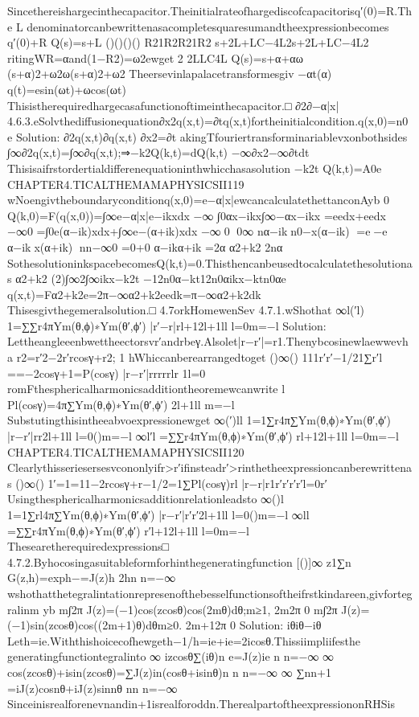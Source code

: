 {{{{{{Sincethereishargecinthecapacitor.Theinitialrateofhargediscofcapacitorisq′(0)=R.The
L
denominatorcanbewrittenasacompletesquaresumandtheexpressionbecomes
q′(0)+R
Q(s)=s+L
()()()()
R21R2R21R2
s+2L+LC−4L2s+2L+LC−4L2
ritingWR=αand(1−R2)=ω2ewget
2
2LLC4L
Q(s)=s+α+αω
(s+α)2+ω2ω(s+α)2+ω2
Theersevinlapalacetransformesgiv
−αt(α)
q(t)=esin(ωt)+ωcos(ωt)
Thisistherequiredhargecasafunctionoftimeinthecapacitor.□
∂2∂−α|x|
4.6.3.eSolvthediffusionequation∂x2q(x,t)=∂tq(x,t)fortheinitialcondition.q(x,0)=n0e
Solution:
∂2q(x,t)∂q(x,t)
∂x2=∂t
akingTfouriertransforminariablevxonbothsides
∫∞∂2q(x,t)=∫∞∂q(x,t);⇒−k2Q(k,t)=dQ(k,t)
−∞∂x2−∞∂tdt
Thisisaifrstordertialdifferenequationinthwhicchasasolution
−k2t
Q(k,t)=A0e
CHAPTER4.TICALTHEMAMAPHYSICSII119
wNoengivtheboundaryconditionq(x,0)=e−α|x|ewcancalculatethettanconAyb
0
Q(k,0)=F(q(x,0))=∫∞e−α|x|e−ikxdx
−∞
∫0αx−ikx∫∞−αx−ikx
=eedx+eedx
−∞0
=∫0e(α−ik)xdx+∫∞e−(α+ik)xdx
−∞0
0∞
nα−ikn0−x(α−ik)
=e−e
α−ikx(α+ik)
nn−∞0
=0+0
α−ikα+ik
=2α
α2+k2
2nα
SothesolutioninkspacebecomesQ(k,t)=0.Thisthencanbeusedtocalculatethesolutionas
α2+k2
(2)∫∞2∫∞ikx−k2t
−12n0α−kt12n0αikx−ktn0αe
q(x,t)=Fα2+k2e=2π−∞α2+k2eedk=π−∞α2+k2dk
Thisesgivthegemeralsolution.□
4.7orkHomewenSev
4.7.1.wShothat
∞l(′l)
1=∑∑r4πYm(θ,ϕ)∗Ym(θ′,ϕ′)
|r′−r|rl+12l+1ll
l=0m=−l
Solution:
Lettheangleeenbwettheectorsvr′andrbeγ.Alsolet|r−r′|=r1.Thenybcosinewlaewwevha
r2=r′2−2r′rcosγ+r2;
1
hWhiccanberearrangedtoget
()∞()
111r′r′−1/21∑r′l
==−2cosγ+1=P(cosγ)
|r−r′|rrrrrlr
1l=0
romFthesphericalharmonicsadditiontheoremewcanwrite
l
Pl(cosγ)=4π∑Ym(θ,ϕ)∗Ym(θ′,ϕ′)
2l+1ll
m=−l
Substutingthisintheeabvoexpressionewget
∞(′)ll
1=1∑r4π∑Ym(θ,ϕ)∗Ym(θ′,ϕ′)
|r−r′|rr2l+1ll
l=0()m=−l
∞l′l
=∑∑r4πYm(θ,ϕ)∗Ym(θ′,ϕ′)
rl+12l+1ll
l=0m=−l
CHAPTER4.TICALTHEMAMAPHYSICSII120
Clearlythisseriesersesvcononlyifr>r′ifinsteadr′>rinthetheexpressioncanberewrittenas
()∞()
1′=1=11−2rcosγ+r−1/2=1∑Pl(cosγ)rl
|r−r|r1r′r′r′r′l=0r′
Usingthesphericalharmonicsadditionrelationleadsto
∞()l
1=1∑rl4π∑Ym(θ,ϕ)∗Ym(θ′,ϕ′)
|r−r′|r′r′2l+1ll
l=0()m=−l
∞ll
=∑∑r4πYm(θ,ϕ)∗Ym(θ′,ϕ′)
r′l+12l+1ll
l=0m=−l
Thesearetherequiredexpressions□
4.7.2.Byhocosingasuitableformforhinthegeneratingfunction
[()]∞
z1∑n
G(z,h)=exph−=J(z)h
2hn
n=−∞
wshothatthetegralintationrepresenofthebesselfunctionsoftheifrstkindareen,givfortegralinm
yb
m∫2π
J(z)=(−1)cos(zcosθ)cos(2mθ)dθ;m≥1,
2m2π
0
m∫2π
J(z)=(−1)sin(zcosθ)cos((2m+1)θ)dθm≥0.
2m+12π
0
Solution:
iθiθ−iθ
Leth=ie.Withthishoicecofhewgeth−1/h=ie+ie=2icosθ.Thissiimpliifesthe
generatingfunctiontegralinto
∞
izcosθ∑(iθ)n
e=J(z)ie
n
n=−∞
∞
cos(zcosθ)+isin(zcosθ)=∑J(z)in(cosθ+isinθ)n
n
n=−∞
∞
∑nn+1
=iJ(z)cosnθ+iJ(z)sinnθ
nn
n=−∞
Sinceinisrealforenevnandin+1isrealforoddn.TherealpartoftheexpressiononRHSis
}}}}}}
